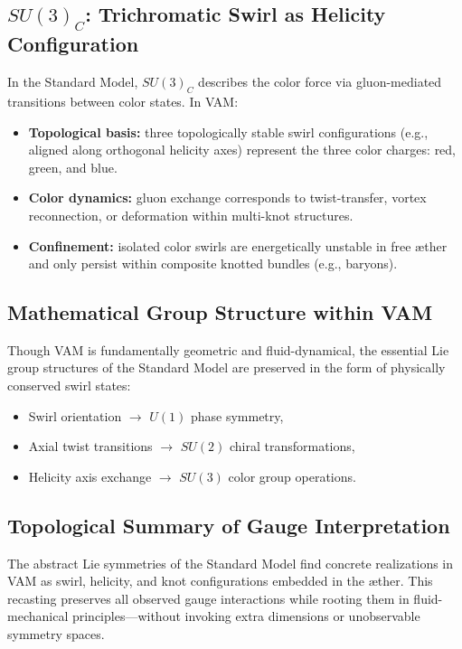 \subsection{$SU(3)_C$: Trichromatic Swirl as Helicity Configuration}

In the Standard Model, $SU(3)_C$ describes the color force via gluon-mediated transitions between color states. In VAM:
\begin{itemize}
    \item \textbf{Topological basis:} three topologically stable swirl configurations (e.g., aligned along orthogonal helicity axes) represent the three color charges: red, green, and blue.
    \item \textbf{Color dynamics:} gluon exchange corresponds to twist-transfer, vortex reconnection, or deformation within multi-knot structures.
    \item \textbf{Confinement:} isolated color swirls are energetically unstable in free æther and only persist within composite knotted bundles (e.g., baryons).
\end{itemize}

\subsection{Mathematical Group Structure within VAM}

Though VAM is fundamentally geometric and fluid-dynamical, the essential Lie group structures of the Standard Model are preserved in the form of physically conserved swirl states:
\begin{itemize}
    \item Swirl orientation $\rightarrow$ $U(1)$ phase symmetry,
    \item Axial twist transitions $\rightarrow$ $SU(2)$ chiral transformations,
    \item Helicity axis exchange $\rightarrow$ $SU(3)$ color group operations.
\end{itemize}

\subsection*{Topological Summary of Gauge Interpretation}

The abstract Lie symmetries of the Standard Model find concrete realizations in VAM as swirl, helicity, and knot configurations embedded in the æther. This recasting preserves all observed gauge interactions while rooting them in fluid-mechanical principles—without invoking extra dimensions or unobservable symmetry spaces.

